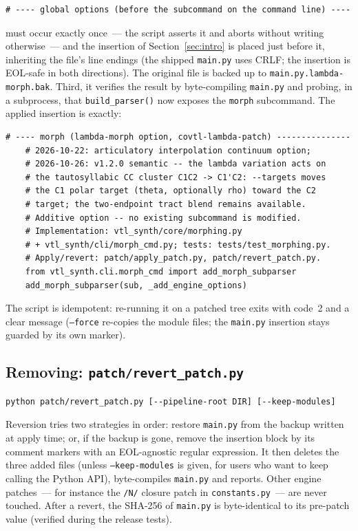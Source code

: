 \documentclass[11pt,a4paper]{article}
\newcommand{\code}[1]{\texttt{#1}}
\newcommand{\sectref}[1]{Section~\ref{#1}}
\begin{document}
\begin{lstlisting}[style=plain]
    # ---- global options (before the subcommand on the command line) ----
\end{lstlisting}

must occur exactly once~--- the script asserts it and aborts without
writing otherwise~--- and the insertion of
\sectref{sec:intro} is placed just before it, inheriting the file's
line endings (the shipped \code{main.py} uses CRLF; the insertion is
EOL-safe in both directions).  The original file is backed up to
\code{main.py.lambda-morph.bak}.  Third, it verifies the result by
byte-compiling \code{main.py} and probing, in a subprocess, that
\code{build\_parser()} now exposes the \code{morph} subcommand.
The applied insertion is exactly:

\begin{lstlisting}[style=python]
    # ---- morph (lambda-morph option, covtl-lambda-patch) ---------------
    # 2026-10-22: articulatory interpolation continuum option;
    # 2026-10-26: v1.2.0 semantic -- the lambda variation acts on
    # the tautosyllabic CC cluster C1C2 -> C1'C2: --targets moves
    # the C1 polar target (theta, optionally rho) toward the C2
    # target; the two-endpoint tract blend remains available.
    # Additive option -- no existing subcommand is modified.
    # Implementation: vtl_synth/core/morphing.py
    # + vtl_synth/cli/morph_cmd.py; tests: tests/test_morphing.py.
    # Apply/revert: patch/apply_patch.py, patch/revert_patch.py.
    from vtl_synth.cli.morph_cmd import add_morph_subparser
    add_morph_subparser(sub, _add_engine_options)
\end{lstlisting}

The script is idempotent: re-running it on a patched tree exits with
code~2 and a clear message (\code{--force} re-copies the module
files; the \code{main.py} insertion stays guarded by its own
marker).

\subsection{Removing: \code{patch/revert\_patch.py}}

\begin{lstlisting}[style=shell]
python patch/revert_patch.py [--pipeline-root DIR] [--keep-modules]
\end{lstlisting}

Reversion tries two strategies in order: restore \code{main.py}
from the backup written at apply time; or, if the backup is gone,
remove the insertion block by its comment markers with an
EOL-agnostic regular expression.  It then deletes the three added
files (unless \code{--keep-modules} is given, for users who want to
keep calling the Python API), byte-compiles \code{main.py} and
reports.  Other engine patches~--- for instance the \code{/N/}
closure patch in \code{constants.py}~--- are never touched.  After a
revert, the SHA-256 of \code{main.py} is byte-identical to its
pre-patch value (verified during the release tests).
\end{document}
